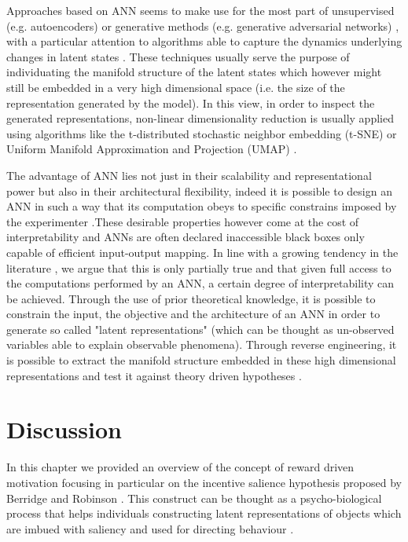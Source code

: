 Approaches based on ANN seems to make use for the most part of unsupervised (e.g. autoencoders) \cite{luxem2020identifying, mccullough2021unsupervised} or generative methods (e.g. generative adversarial networks) \cite{eyjolfsdottir2016learning, mccullough2021unsupervised}, with a particular attention to algorithms able to capture the dynamics underlying changes in latent states \cite{eyjolfsdottir2016learning, song2017reward}. These techniques usually serve the purpose of individuating the manifold structure of the latent states \cite{eyjolfsdottir2016learning} which however might still be embedded in a very high dimensional space (i.e. the size of the representation generated by the model). In this view, in order to inspect the generated representations, non-linear dimensionality reduction is usually applied \cite{mccullough2021unsupervised} using algorithms like the t-distributed stochastic neighbor embedding \cite{van2008visualizing} (t-SNE) or Uniform Manifold Approximation and Projection (UMAP) \cite{mcinnes2018umap-software}. 

The advantage of ANN lies not just in their scalability and representational power but also in their architectural flexibility, indeed it is possible to design an ANN in such a way that its computation obeys to specific constrains imposed by the experimenter \cite{eyjolfsdottir2016learning}.These desirable properties however come at the cost of interpretability and ANNs are often declared inaccessible black boxes only capable of  efficient input-output mapping. In line with a growing tendency in the literature \cite{barak2017recurrent,kietzmann2018deep, luxem2020identifying, pereira2020quantifying, mccullough2021unsupervised, shi2021learning}, we argue that this is only partially true and that given full access to the computations performed by an ANN, a certain degree of interpretability can be achieved. Through the use of prior theoretical knowledge, it is possible to constrain the input, the objective and the architecture of an ANN in order to generate so called "latent representations" (which can be thought as un-observed variables able to explain observable phenomena). Through reverse engineering, it is possible to extract the manifold structure embedded in these high dimensional representations and test it against theory driven hypotheses \cite{barak2017recurrent,kietzmann2018deep}. 

\section{Discussion}
\label{discussion_litreview}
In this chapter we provided an overview of the concept of reward driven motivation focusing in particular on the incentive salience hypothesis proposed by Berridge and Robinson \cite{berridge1998role}. This construct can be thought as a psycho-biological process that helps individuals constructing latent representations of objects which are imbued with saliency and used for directing behaviour \cite{berridge2004motivation}. 

